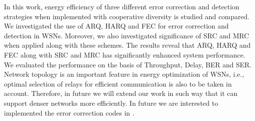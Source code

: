 \documentclass{sig-alternate}
\begin{document}
In this work, energy efficiency of three different error correction and detection strategies when implemented with cooperative diversity is studied and compared. We investigated the use of ARQ, HARQ and FEC for error correction and detection in WSNs. Moreover, we also investigated significance of SRC and MRC when applied along with these schemes. The results reveal that ARQ, HARQ and FEC along with SRC and MRC has significantly enhanced system performance. We evaluated the performance on the basis of Throughput, Delay, BER and SER. Network topology is an important feature in energy optimization of WSNs, i.e., optimal selection of relays for efficient communication is also to be taken in account. Therefore, in future we will extend our work in such way that it can support denser networks more efficiently. In future we are interested to implemented the error correction codes in \cite{17-20}.
\end{document}
